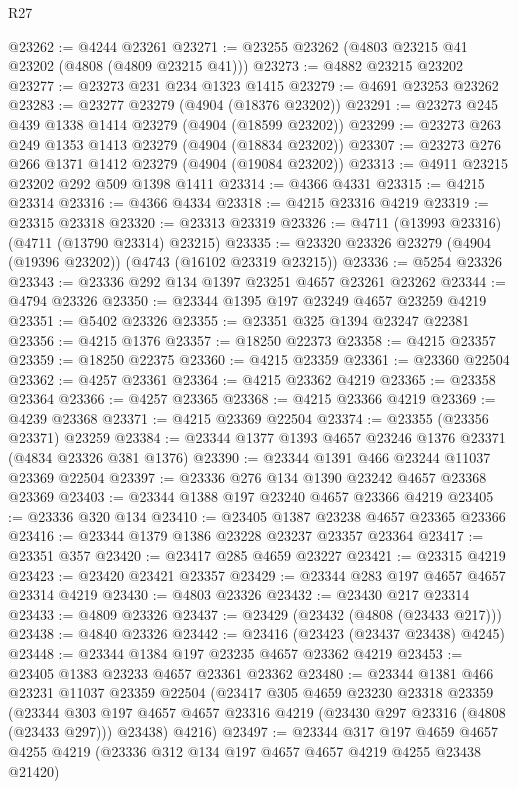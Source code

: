 \begin{lexlean}{R27}
\begin{coremodule}
@23262 := @4244 @23261
@23271 := @23255 @23262 (@4803 @23215 @41 @23202 (@4808 (@4809 @23215 @41)))
@23273 := @4882 @23215 @23202
@23277 := @23273 @231 @234 @1323 @1415
@23279 := @4691 @23253 @23262
@23283 := @23277 @23279 (@4904 (@18376 @23202))
@23291 := @23273 @245 @439 @1338 @1414 @23279 (@4904 (@18599 @23202))
@23299 := @23273 @263 @249 @1353 @1413 @23279 (@4904 (@18834 @23202))
@23307 := @23273 @276 @266 @1371 @1412 @23279 (@4904 (@19084 @23202))
@23313 := @4911 @23215 @23202 @292 @509 @1398 @1411
@23314 := @4366 @4331
@23315 := @4215 @23314
@23316 := @4366 @4334
@23318 := @4215 @23316 @4219
@23319 := @23315 @23318
@23320 := @23313 @23319
@23326 := @4711 (@13993 @23316) (@4711 (@13790 @23314) @23215)
@23335 := @23320 @23326 @23279 (@4904 (@19396 @23202)) (@4743 (@16102 @23319 @23215))
@23336 := @5254 @23326
@23343 := @23336 @292 @134 @1397 @23251 @4657 @23261 @23262
@23344 := @4794 @23326
@23350 := @23344 @1395 @197 @23249 @4657 @23259 @4219
@23351 := @5402 @23326
@23355 := @23351 @325 @1394 @23247 @22381
@23356 := @4215 @1376
@23357 := @18250 @22373
@23358 := @4215 @23357
@23359 := @18250 @22375
@23360 := @4215 @23359
@23361 := @23360 @22504
@23362 := @4257 @23361
@23364 := @4215 @23362 @4219
@23365 := @23358 @23364
@23366 := @4257 @23365
@23368 := @4215 @23366 @4219
@23369 := @4239 @23368
@23371 := @4215 @23369 @22504
@23374 := @23355 (@23356 @23371) @23259
@23384 := @23344 @1377 @1393 @4657 @23246 @1376 @23371 (@4834 @23326 @381 @1376)
@23390 := @23344 @1391 @466 @23244 @11037 @23369 @22504
@23397 := @23336 @276 @134 @1390 @23242 @4657 @23368 @23369
@23403 := @23344 @1388 @197 @23240 @4657 @23366 @4219
@23405 := @23336 @320 @134
@23410 := @23405 @1387 @23238 @4657 @23365 @23366
@23416 := @23344 @1379 @1386 @23228 @23237 @23357 @23364
@23417 := @23351 @357
@23420 := @23417 @285 @4659 @23227
@23421 := @23315 @4219
@23423 := @23420 @23421 @23357
@23429 := @23344 @283 @197 @4657 @4657 @23314 @4219
@23430 := @4803 @23326
@23432 := @23430 @217 @23314
@23433 := @4809 @23326
@23437 := @23429 (@23432 (@4808 (@23433 @217)))
@23438 := @4840 @23326
@23442 := @23416 (@23423 (@23437 @23438) @4245)
@23448 := @23344 @1384 @197 @23235 @4657 @23362 @4219
@23453 := @23405 @1383 @23233 @4657 @23361 @23362
@23480 := @23344
    @1381
    @466
    @23231
    @11037
    @23359
    @22504
    (@23417
      @305
      @4659
      @23230
      @23318
      @23359
      (@23344 @303 @197 @4657 @4657 @23316 @4219 (@23430 @297 @23316 (@4808 (@23433 @297))) @23438)
      @4216)
@23497 := @23344
    @317
    @197
    @4659
    @4657
    @4255
    @4219
    (@23336 @312 @134 @197 @4657 @4657 @4219 @4255 @23438 @21420)

\end{coremodule}
\end{lexlean}
